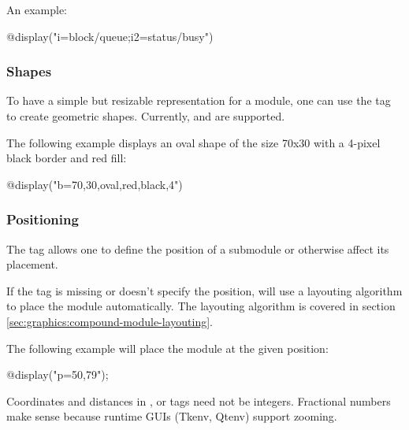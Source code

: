 An example:

\begin{ned}
@display("i=block/queue;i2=status/busy")
\end{ned}

\begin{center}
\end{center}

\subsubsection{Shapes}
\label{sec:graphics:submodule-shapes}

To have a simple but resizable representation for a module, one can use
the  tag to create geometric shapes. Currently,  and
 are supported.

The following example displays an oval shape of the size 70x30 with a 4-pixel
black border and red fill:

\begin{ned}
@display("b=70,30,oval,red,black,4")
\end{ned}

\begin{center}
\end{center}

\subsubsection{Positioning}
\label{sec:graphics:submodule-positioning}

The  tag allows one to define the position of a submodule or
otherwise affect its placement.

\begin{note}
If the  tag is missing or doesn't specify the position, {\opp} will
use a layouting algorithm to place the module automatically. The layouting
algorithm is covered in section \ref{sec:graphics:compound-module-layouting}.
\end{note}

The following example will place the module at the given position:

\begin{ned}
@display("p=50,79");
\end{ned}

\begin{note}
Coordinates and distances in ,  or  tags need not
be integers. Fractional numbers make sense because runtime GUIs (Tkenv,
Qtenv) support zooming.
\end{note}

